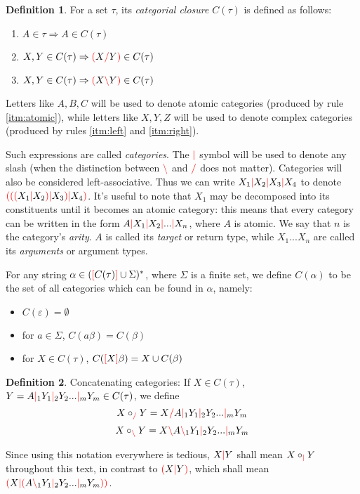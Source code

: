 \documentclass[12pt]{extarticle}
\theoremstyle{definition} \newtheorem{defn}{Definition}
\theoremstyle{definition} \newtheorem{prop}{Proposition}
\newcommand{\lc}{\textcolor{red}{\backslash}}
\newcommand{\rc}{\textcolor{red}{/}}
\newcommand{\mc}{\textcolor{red}{|}}
\newcommand{\lb}{\textcolor{red}{[}}
\newcommand{\rb}{\textcolor{red}{]}}
\newcommand{\lp}{\textcolor{red}{(}}
\newcommand{\rp}{\textcolor{red}{)}}
\begin{document}
\begin{defn}
    For a set $\tau$, its \emph{categorial closure} $C(\tau)$ is defined as follows:
    \begin{enumerate}
        \item \label{itm:atomic} $A \in \tau \Rightarrow A \in C(\tau)$
        \item \label{itm:right}  $X, Y \in C(\tau) \Rightarrow \lp X \rc Y \rp \in C(\tau)$
        \item \label{itm:left}   $X, Y \in C(\tau) \Rightarrow \lp X \lc Y \rp \in C(\tau)$
    \end{enumerate}

    Letters like $A, B, C$ will be used to denote atomic categories (produced
    by rule \ref{itm:atomic}), while letters like $X, Y, Z$ will be used to
    denote complex categories (produced by rules \ref{itm:left} and \ref{itm:right}).

    Such expressions are called \emph{categories}. The $\mc$ symbol will be
    used to denote any slash (when the distinction between $\lc$ and $\rc$
    does not matter). Categories will also be considered left-associative.
    Thus we can write $X_1 \mc X_2 \mc X_3 \mc X_4$ to denote
    $\lp \lp \lp X_1 \mc X_2 \rp \mc X_3 \rp \mc X_4 \rp$. It's useful to note that $X_1$ may
    be decomposed into its constituents until it becomes an atomic category:
    this means that every category can be written in the form
    $A \mc X_1 \mc X_2 \mc ... \mc X_n$, where $A$ is atomic. We say that
    $n$ is the category's \emph{arity}. $A$ is called its \emph{target} or
    return type, while
    $X_1 ... X_n$ are called its \emph{arguments} or argument types.

    For any string $\alpha \in (\lb C(\tau) \rb \cup \Sigma)^*$, where $\Sigma$ is a
    finite set, we define $C(\alpha)$ to be the set of all categories which
    can be found in $\alpha$, namely:
    \begin{itemize}
        \item $C(\varepsilon) = \emptyset$
        \item for $a \in \Sigma$, $C(a\beta) = C(\beta)$
        \item for $X \in C(\tau)$, $C(\lb X \rb \beta) = X \cup C(\beta)$
    \end{itemize}
\end{defn}

\begin{defn}
    Concatenating categories: If $X \in C(\tau)$,
    $Y = A \mc_1 Y_1 \mc_2 Y_2 ... \mc_m Y_m \in C(\tau)$, we define
    \[ X \circ_{\rc} Y = X \rc A \mc_1 Y_1 \mc_2 Y_2 ... \mc_m Y_m \]
    \[ X \circ_{\lc} Y = X \lc A \lc_1 Y_1 \mc_2 Y_2 ... \mc_m Y_m \]

    Since using this notation everywhere is tedious, $X \mc Y$ shall mean
    $X \circ_{\mc} Y$ throughout this text, in contrast to
    $\lp X \mc Y \rp$, which shall mean $\lp X \mc \lp A \lc_1 Y_1 \mc_2 Y_2 ... \mc_m Y_m \rp \rp$.
\end{defn}
\end{document}
